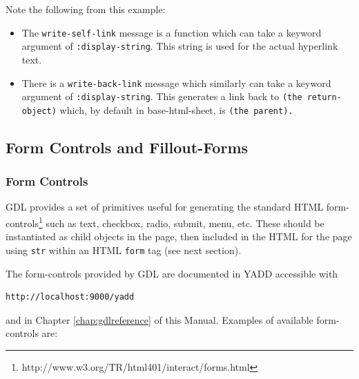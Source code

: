 \documentclass [11pt]{book}
\begin{document}
 Note the following from this example:

\begin{itemize}

\item The \texttt{write-self-link} message is a function which can take a keyword argument
   of \texttt{:display-string}. This string is used for the actual hyperlink text.

\item There is a \texttt{write-back-link} message which similarly can take a keyword argument of \texttt{:display-string}. This generates a link back to \texttt{(the return-object)} which, by default in base-html-sheet, is \texttt{(the parent).}

\end{itemize}





\subsection{Form Controls and Fillout-Forms}

\label{subsec:formcontrolsandfillout-forms}



\subsubsection{Form Controls}

\label{subsubsec:formcontrols}



GDL provides a set of primitives useful for generating the
       standard HTML form-controls\footnote{http://www.w3.org/TR/html401/interact/forms.html} such as text, checkbox, radio, submit, menu, etc. These
            should be instantiated as child objects in the page, then
            included in the HTML for the page
            using \texttt{str} within an
            HTML \texttt{form} tag (see next section).



The form-controls provided by GDL are documented in YADD accessible with 

\begin{verbatim}http://localhost:9000/yadd
\end{verbatim} and in Chapter 
\ref{chap:gdlreference} of this Manual. Examples of 
available form-controls are:
\end{document}
